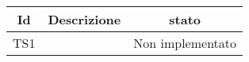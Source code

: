 \begin{center}
	\begin{longtable}{|c|>{\centering}m{7cm}|c|}\hline
		Id & Descrizione & stato \\ \hline
		TS1 &  & Non implementato \\ \hline
	\end{longtable}
\end{center}
